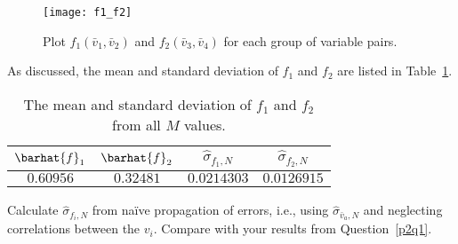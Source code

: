 \begin{figure}
    \centering
    \texttt{[image: f1\_f2]}
    \caption{Plot \(f_1(\bar{v}_1, \bar{v}_2)\) and \(f_2(\bar{v}_3, \bar{v}_4)\) for each group of variable pairs.}
    \label{fig:fi}
\end{figure}

As discussed, the mean and standard deviation of \(f_1\) and
\(f_2\) are listed in Table~\ref{tab:stdf1f2}.

\begin{table}
    \centering
    \caption{The mean and standard deviation of \(f_1\) and \(f_2\) from all \(M\) values.}
    \label{tab:stdf1f2}
    \begin{tabular}{@{}cccc@{}}
        \toprule
        \(\barhat{f}_1\) & \(\barhat{f}_2\) & \(\hat{\sigma}_{f_1,N}\) & \(\hat{\sigma}_{f_2,N}\) \\
        \midrule
        \(0.60956\)      & \(0.32481\)      & \(0.0214303\)            & \(0.0126915\)            \\
        \bottomrule
    \end{tabular}
\end{table}


\Question{} Calculate \(\hat{\sigma}_{f_i,N}\) from naïve propagation of errors, i.e., using
\(\hat{\sigma}_{\bar{v}_a,N}\) and neglecting correlations between the \(v_i\). Compare with
your results from Question~\ref{p2q1}.


